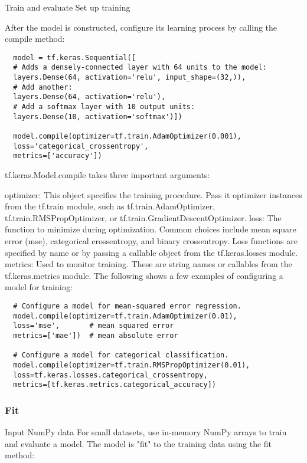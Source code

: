 Train and evaluate
Set up training

After the model is constructed, configure its learning process by calling the compile method:

\begin{verbatim}
  model = tf.keras.Sequential([
  # Adds a densely-connected layer with 64 units to the model:
  layers.Dense(64, activation='relu', input_shape=(32,)),
  # Add another:
  layers.Dense(64, activation='relu'),
  # Add a softmax layer with 10 output units:
  layers.Dense(10, activation='softmax')])

  model.compile(optimizer=tf.train.AdamOptimizer(0.001),
  loss='categorical_crossentropy',
  metrics=['accuracy'])

\end{verbatim}

tf.keras.Model.compile takes three important arguments:

optimizer: This object specifies the training procedure. Pass it optimizer instances from the tf.train module, such as tf.train.AdamOptimizer, tf.train.RMSPropOptimizer, or tf.train.GradientDescentOptimizer.
loss: The function to minimize during optimization. Common choices include mean square error (mse), categorical crossentropy, and binary crossentropy. Loss functions are specified by name or by passing a callable object from the tf.keras.losses module.
metrics: Used to monitor training. These are string names or callables from the tf.keras.metrics module.
\para{}
The following shows a few examples of configuring a model for training:
\begin{verbatim}
  # Configure a model for mean-squared error regression.
  model.compile(optimizer=tf.train.AdamOptimizer(0.01),
  loss='mse',       # mean squared error
  metrics=['mae'])  # mean absolute error

  # Configure a model for categorical classification.
  model.compile(optimizer=tf.train.RMSPropOptimizer(0.01),
  loss=tf.keras.losses.categorical_crossentropy,
  metrics=[tf.keras.metrics.categorical_accuracy])

\end{verbatim}

\subsubsection{Fit}
Input NumPy data
For small datasets, use in-memory NumPy arrays to train and evaluate a model. The model is "fit" to the training data using the fit method:

